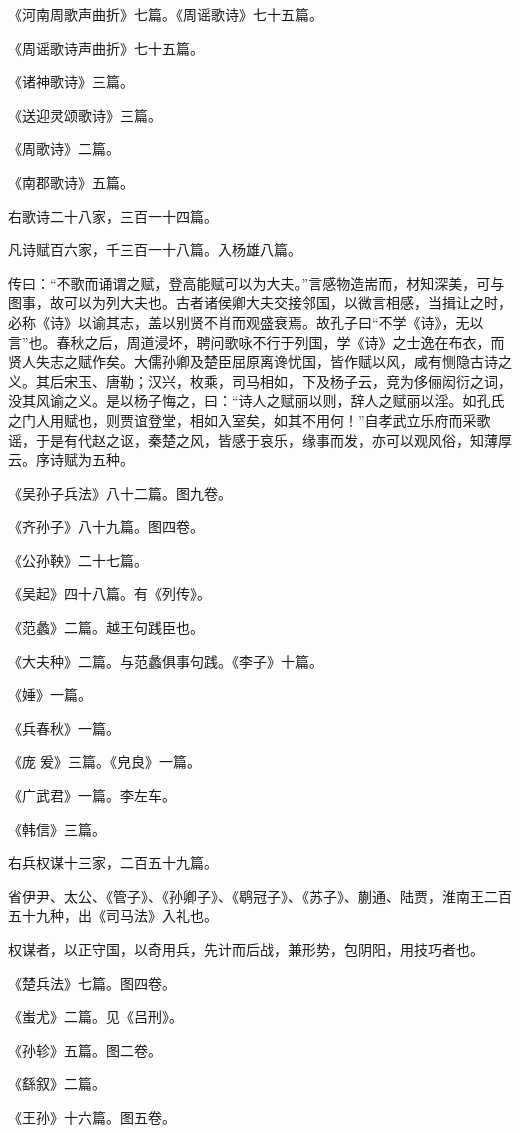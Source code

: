 \documentclass[]{article}
\begin{document}
《河南周歌声曲折》七篇。《周谣歌诗》七十五篇。

《周谣歌诗声曲折》七十五篇。

《诸神歌诗》三篇。

《送迎灵颂歌诗》三篇。

《周歌诗》二篇。

《南郡歌诗》五篇。

右歌诗二十八家，三百一十四篇。

凡诗赋百六家，千三百一十八篇。入杨雄八篇。

传曰：``不歌而诵谓之赋，登高能赋可以为大夫。''言感物造耑而，材知深美，可与图事，故可以为列大夫也。古者诸侯卿大夫交接邻国，以微言相感，当揖让之时，必称《诗》以谕其志，盖以别贤不肖而观盛衰焉。故孔子曰``不学《诗》，无以言''也。春秋之后，周道浸坏，聘问歌咏不行于列国，学《诗》之士逸在布衣，而贤人失志之赋作矣。大儒孙卿及楚臣屈原离谗忧国，皆作赋以风，咸有恻隐古诗之义。其后宋玉、唐勒；汉兴，枚乘，司马相如，下及杨子云，竞为侈俪闳衍之词，没其风谕之义。是以杨子悔之，曰：``诗人之赋丽以则，辞人之赋丽以淫。如孔氏之门人用赋也，则贾谊登堂，相如入室矣，如其不用何！''自孝武立乐府而采歌谣，于是有代赵之讴，秦楚之风，皆感于哀乐，缘事而发，亦可以观风俗，知薄厚云。序诗赋为五种。

《吴孙子兵法》八十二篇。图九卷。

《齐孙子》八十九篇。图四卷。

《公孙鞅》二十七篇。

《吴起》四十八篇。有《列传》。

《范蠡》二篇。越王句践臣也。

《大夫种》二篇。与范蠡俱事句践。《李子》十篇。

《娷》一篇。

《兵春秋》一篇。

《庞爰》三篇。《皃良》一篇。

《广武君》一篇。李左车。

《韩信》三篇。

右兵权谋十三家，二百五十九篇。

省伊尹、太公、《管子》、《孙卿子》、《鹖冠子》、《苏子》、蒯通、陆贾，淮南王二百五十九种，出《司马法》入礼也。

权谋者，以正守国，以奇用兵，先计而后战，兼形势，包阴阳，用技巧者也。

《楚兵法》七篇。图四卷。

《蚩尤》二篇。见《吕刑》。

《孙轸》五篇。图二卷。

《繇叙》二篇。

《王孙》十六篇。图五卷。
\end{document}
